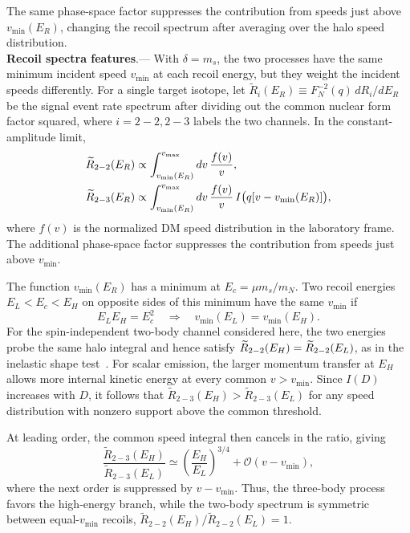 \documentclass[prd,showpacs,preprintnumbers,amsmath,amssymb,twocolumn,
superscriptaddress,notitlepage]{revtex4-2}
\begin{document}
The same phase-space factor suppresses the contribution
from speeds just above $v_{\min}(E_R)$, changing the recoil
spectrum after averaging over the halo speed distribution.
\\

\noindent \textbf{Recoil spectra features}.---
With $\delta=m_s$, the two processes have the same minimum
incident speed $v_{\min}$ at each recoil energy, but they weight the
incident speeds differently. For a single target isotope,
let $\widetilde R_i(E_R)\equiv F_N^{-2}(q)\,dR_i/dE_R$ be the
signal event rate spectrum after dividing out the common nuclear form
factor squared, where $i=2-2,2-3$ labels the two channels. In the
constant-amplitude limit,
\begin{align}
\widetilde R_{\rm 2-2}(E_R)&\propto
\int_{v_{\min}(E_R)}^{v_{\max}}dv\,\frac{f(v)}{v},
\label{eq:equal-vmin-rate-two}\\
\widetilde R_{\rm 2-3}(E_R)&\propto
\int_{v_{\min}(E_R)}^{v_{\max}}dv\,\frac{f(v)}{v}\,
I\bigl(q[v-v_{\min}(E_R)]\bigr), \nonumber
\label{eq:equal-vmin-rate-three}
\end{align}
where $f(v)$ is the normalized DM speed distribution in the
laboratory frame. The additional phase-space factor suppresses
the contribution from speeds just above $v_{\min}$.

The function $v_{\min}(E_R)$ has a minimum at
$E_c=\mu m_s/m_N$. Two recoil energies $E_L<E_c<E_H$ on
opposite sides of this minimum have the same $v_{\min}$ if
\begin{equation}
E_L E_H=E_c^2 \quad \Rightarrow 
\quad   v_{\min}(E_L) = v_{\min}(E_H) .
\label{eq:equal-vmin-energy-pair}
\end{equation}
For the spin-independent two-body channel considered here, the
two energies probe the same halo integral and hence satisfy
$\widetilde R_{\rm 2-2}(E_H)=\widetilde R_{\rm 2-2}(E_L)$, as in the
inelastic shape test~\cite{Bozorgnia:2013hsa}.
For scalar emission, the larger momentum transfer at $E_H$
allows more internal kinetic energy at every common
$v>v_{\min}$. Since $I(D)$ increases with $D$, it follows that
$\widetilde R_{2-3}(E_H)>\widetilde R_{2-3}(E_L)$ for any speed
distribution with nonzero support above the common threshold.

At leading order, the common speed integral then
cancels in the ratio, giving
\begin{equation}
\frac{\widetilde R_{2-3}(E_H)}{\widetilde R_{2-3}(E_L)}
\simeq \left(\frac{E_H}{E_L}\right)^{3/4} + \mathcal{O}(v-v_{\min}),
\label{eq:equal-vmin-branch-ratios}
\end{equation}
where the next order is suppressed by $v-v_{\min}$. Thus, the three-body process favors the high-energy branch,
while the two-body spectrum is symmetric between equal-$v_{\min}$ recoils, $\widetilde{R}_{2-2}(E_H)/\widetilde{R}_{2-2}(E_L)=1$.
\\
\end{document}
